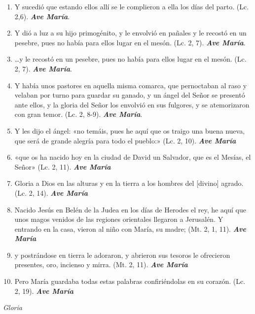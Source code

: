 \documentclass[a4paper,11pt, oneside]{report}
\begin{document}
\begin{enumerate}
  \item Y sucedió que estando ellos allí se le complieron a ella los días del parto. (Lc. 2,6). \textbf{\textit{Ave María}}.

  \item Y dió a luz a su hijo primogénito, y le envolvió en pañales y le recostó en un pesebre, pues no había para ellos lugar en el mesón.  
  (Lc. 2, 7). \textbf{\textit{Ave María}}.

  \item \ldots y le recostó en un pesebre, pues no había para ellos lugar en el mesón. (Lc. 2, 7). \textbf{\textit{Ave María}}.

  \item Y había unos pastores en aquella misma comarca, que pernoctaban al raso y velaban por turno para guardar su ganado, y un ángel
  del Señor se presentó ante ellos, y la gloria del Señor los envolvió en sus fulgores, y se atemorizaron con gran temor. (Lc. 2, 8-9). \textbf{\textit{Ave María}}.

  \item Y les dijo el ángel: «no temáis, pues he aquí que os traigo una buena nueva, que será de grande alegría para todo el pueblo:» (Lc. 2, 10). \textbf{\textit{Ave María}}

  \item «que os ha nacido hoy en la ciudad de David un Salvador, que es el Mesías, el Señor» (Lc. 2, 11). \textbf{\textit{Ave María}}

  \item Gloria a Dios en las alturas y en la tierra a los hombres del [divino] agrado. (Lc. 2, 14). \textbf{\textit{Ave María}}

  \item Nacido Jesús en Belén de la Judea en los días de Herodes el rey, he aquí que unos magos venidos de las regiones orientales llegaron a Jerusalén.
  Y entrando en la casa, vieron al niño con María, su madre; (Mt. 2, 1, 11). \textbf{\textit{Ave María}}

  \item y postrándose en tierra le adoraron, y abrieron sus tesoros le ofrecieron presentes, oro, incienso y mirra. (Mt. 2, 11). \textbf{\textit{Ave María}}

  \item Pero María guardaba todas estas palabras confiriéndolas en su corazón. (Lc. 2, 19). \textbf{\textit{Ave María}}
\end{enumerate}
\indent\textit{Gloria}  
  
\end{document}

